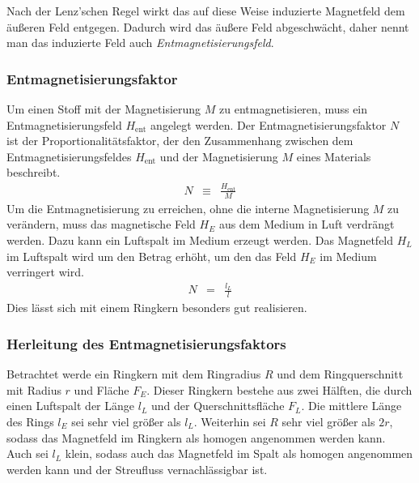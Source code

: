 \documentclass[12pt,a4paper]{scrartcl}
\numberwithin{equation}{section} %
\begin{document}
Nach der Lenz'schen Regel wirkt das auf diese Weise induzierte Magnetfeld dem äußeren Feld entgegen. Dadurch wird das äußere Feld abgeschwächt, daher nennt man das induzierte Feld auch \emph{Entmagnetisierungsfeld}.

\hypertarget{entmagnetisierungsfaktor}{%
\subsubsection{Entmagnetisierungsfaktor}\label{entmagnetisierungsfaktor}}
Um einen Stoff mit der Magnetisierung $M$ zu entmagnetisieren, muss ein Entmagnetisierungsfeld $H_\mathrm{ent}$ angelegt werden. Der Entmagnetisierungsfaktor $N$ ist der Proportionalitätsfaktor, der den Zusammenhang zwischen dem Entmagnetisierungsfeldes $H_\mathrm{ent}$ und der Magnetisierung $M$ eines Materials beschreibt.
\begin{eqnarray}
    N &\equiv& \frac{H_\mathrm{ent}}{M} \label{defN}
\end{eqnarray}
Um die Entmagnetisierung zu erreichen, ohne die interne Magnetisierung $M$ zu verändern, muss das magnetische Feld $H_E$ aus dem Medium in Luft verdrängt werden. Dazu kann ein Luftspalt im Medium erzeugt werden. Das Magnetfeld $H_L$ im Luftspalt wird um den Betrag erhöht, um den das Feld $H_E$ im Medium verringert wird.
\begin{eqnarray}
    N &=& \frac{l_L}{l} \label{N}
\end{eqnarray}
Dies lässt sich mit einem Ringkern besonders gut realisieren.

\hypertarget{herleitung-des-entmagnetisierungsfaktors}{%
\subsubsection{Herleitung des Entmagnetisierungsfaktors}\label{herleitung-des-entmagnetisierungsfaktors}}
Betrachtet werde ein Ringkern mit dem Ringradius $R$ und dem Ringquerschnitt mit Radius $r$ und Fläche $F_E$. Dieser Ringkern bestehe aus zwei Hälften, die durch einen Luftspalt der Länge $l_L$ und der Querschnittsfläche $F_L$. Die mittlere Länge des Rings $l_E$ sei sehr viel größer als $l_L$. Weiterhin sei $R$ sehr viel größer als $2r$, sodass das Magnetfeld im Ringkern als homogen angenommen werden kann. Auch sei $l_L$ klein, sodass auch das Magnetfeld im Spalt als homogen angenommen werden kann und der Streufluss vernachlässigbar ist.
\end{document}
